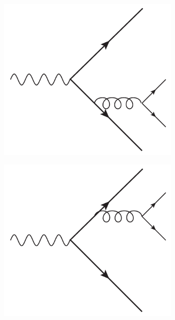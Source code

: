\begin{figure}
\begin{center}
\hfill ~\\
    \begin{subfigure}{0.244\textwidth}
      \includegraphics[width=\textwidth]{Chapters/pQCD/gluon5.pdf}\caption{}\end{subfigure}
    \begin{subfigure}{0.244\textwidth}
      \includegraphics[width=\textwidth]{Chapters/pQCD/gluon6.pdf}\caption{}\end{subfigure}

\end{center}
\end{figure}
